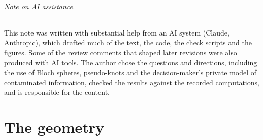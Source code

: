 \documentclass[11pt]{article}
\theoremstyle{definition}\newtheorem{definition}[theorem]{Definition}\newtheorem{remark}[theorem]{Remark}\newtheorem{example}[theorem]{Example}\newtheorem{problem}[theorem]{Open problem}\crefname{problem}{Problem}{Problems}
\begin{document}
\begin{abstract}
decision while every compatibility test passes: compatibility does not imply honesty. A wider cover of tables catches such a coalition exactly when it has a positive separation margin, so reconciliation and inspection are one mechanism; a conflict never names its culprit; and a relay delays the coalition by an amount that depends on the trace of its events, which the braid, by cancelling contacts that were opened and closed, cannot bound.

Section~1 states the status of every claim (proved, cited, computed or open), and a ledger of check scripts records every computation.
\end{abstract}

\paragraph{Note on AI assistance.} This note was written with substantial help from an AI system (Claude, Anthropic), which drafted much of the text, the code, the check scripts and the figures. Some of the review comments that shaped later revisions were also produced with AI tools. The author chose the questions and directions, including the use of Bloch spheres, pseudo-knots and the decision-maker's private model of contaminated information, checked the results against the recorded computations, and is responsible for the content.

\part{The geometry}
\end{document}
